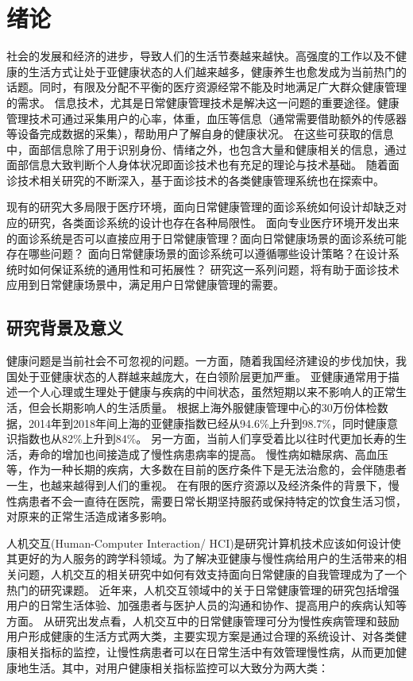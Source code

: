 \chapter{绪论}

社会的发展和经济的进步，导致人们的生活节奏越来越快。高强度的工作以及不健康的生活方式让处于亚健康状态的人们越来越多，健康养生也愈发成为当前热门的话题。同时，有限及分配不平衡的医疗资源经常不能及时地满足广大群众健康管理的需求\cite{雷鹏2019中国医疗资源配置与服务利用现状评价}。
信息技术，尤其是日常健康管理技术是解决这一问题的重要途径。健康管理技术可通过采集用户的心率，体重，血压等信息（通常需要借助额外的传感器等设备完成数据的采集），帮助用户了解自身的健康状况。
在这些可获取的信息中，面部信息除了用于识别身份、情绪之外，也包含大量和健康相关的信息，通过面部信息大致判断个人身体状况即面诊技术也有充足的理论与技术基础\cite{li2020tcminet}。
随着面诊技术相关研究的不断深入，基于面诊技术的各类健康管理系统也在探索中\cite{林锋2019中医面诊系统调研报告}。

现有的研究大多局限于医疗环境，面向日常健康管理的面诊系统如何设计却缺乏对应的研究，各类面诊系统的设计也存在各种局限性。
面向专业医疗环境开发出来的面诊系统是否可以直接应用于日常健康管理？面向日常健康场景的面诊系统可能存在哪些问题？
面向日常健康场景的面诊系统可以遵循哪些设计策略？在设计系统时如何保证系统的通用性和可拓展性？
% 
研究这一系列问题，将有助于面诊技术应用到日常健康场景中，满足用户日常健康管理的需要。

\section{研究背景及意义}
健康问题是当前社会不可忽视的问题。一方面，随着我国经济建设的步伐加快，我国处于亚健康状态的人群越来越庞大，在白领阶层更加严重。
亚健康通常用于描述一个人心理或生理处于健康与疾病的中间状态，虽然短期以来不影响人的正常生活，但会长期影响人的生活质量。
根据上海外服健康管理中心的30万份体检数据，2014年到2018年间上海的亚健康指数已经从94.6\%上升到98.7\%，同时健康意识指数也从82\%上升到84\%\cite{health_report2019}。
另一方面，当前人们享受着比以往时代更加长寿的生活，寿命的增加也间接造成了慢性病患病率的提高\cite{OlshanskyDEMOGRAPHY}。
慢性病如糖尿病、高血压等，作为一种长期的疾病，大多数在目前的医疗条件下是无法治愈的，会伴随患者一生，也越来越得到人们的重视\cite{blandford2019hci}。
在有限的医疗资源以及经济条件的背景下，慢性病患者不会一直待在医院，需要日常长期坚持服药或保持特定的饮食生活习惯，对原来的正常生活造成诸多影响\cite{lupton2017self-tracking}。

人机交互(Human-Computer Interaction/ HCI)是研究计算机技术应该如何设计使其更好的为人服务的跨学科领域。为了解决亚健康与慢性病给用户的生活带来的相关问题，人机交互的相关研究中如何有效支持面向日常健康的自我管理成为了一个热门的研究课题。
近年来，人机交互领域中的关于日常健康管理的研究包括增强用户的日常生活体验、加强患者与医护人员的沟通和协作、提高用户的疾病认知等方面。
从研究出发点看，人机交互中的日常健康管理可分为慢性疾病管理和鼓励用户形成健康的生活方式两大类，主要实现方案是通过合理的系统设计、对各类健康相关指标的监控，让慢性病患者可以在日常生活中有效管理慢性病，从而更加健康地生活。其中，对用户健康相关指标监控可以大致分为两大类：

